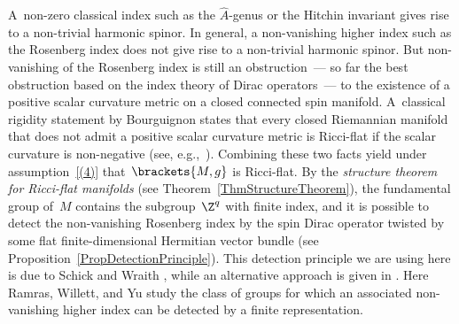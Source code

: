 \documentclass[pdftex]{sigma}
\numberwithin{equation}{section}
\begin{document}
A~non-zero classical index such as the $\hat{A}$-genus or the Hitchin invariant gives rise to a non-trivial harmonic spinor. In general, a non-vanishing higher index such as the Rosenberg index does not give rise to a non-trivial harmonic spinor. But non-vanishing of the Rosenberg index is still an obstruction~--- so far the best obstruction based on the index theory of Dirac operators~--- to the existence of a positive scalar curvature metric on a closed connected spin manifold. A~classical rigidity statement by Bourguignon states that every closed Riemannian manifold that does not admit a positive scalar curvature metric is Ricci-flat if the scalar curvature is non-negative (see, e.g.,~\cite{Kazdan1975a}). Combining these two facts yield under assumption~\ref{(4)} that~$\brackets{M,g}$ is Ricci-flat. By the \textit{structure theorem for Ricci-flat manifolds} (see Theorem~\ref{ThmStructureTheorem}), the fundamental group of~$M$ contains the subgroup~$\Z^q$ with finite index, and it is possible to detect the non-vanishing Rosenberg index by the spin Dirac operator twisted by some flat finite-dimensional Hermitian vector bundle (see Proposition~\ref{PropDetectionPrinciple}). This detection principle we are using here is due to Schick and Wraith \cite{Schick2021a}, while an alternative approach is given in \cite[Section 3]{Ramras2013}. Here Ramras, Willett, and Yu \cite{Ramras2013} study the class of groups for which an associated non-vanishing higher index can be detected by a finite representation.
\end{document}
